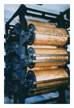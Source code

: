 \begin{figure}[h!]
	\centering
	\begin{subfigure}[b]{0.2\linewidth}
	  \includegraphics[width=\linewidth]{img/mangorlo.jpg}
	  \caption{}
	\end{subfigure}
	\begin{subfigure}[b]{0.3\linewidth}

\end{subfigure}
\end{figure}
